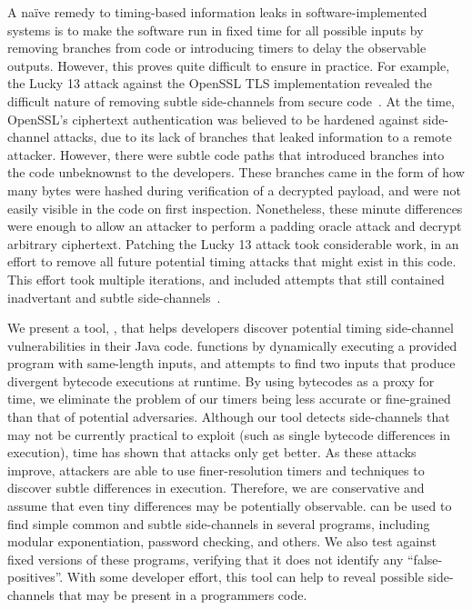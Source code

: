 A na\"ive remedy to timing-based information leaks in software-implemented
systems is to make the software run in fixed time for all possible inputs by
removing branches from code or
introducing timers to delay the observable outputs. 
However, this proves quite difficult to ensure in practice. For example, the Lucky 13
attack against the OpenSSL TLS implementation revealed the difficult nature of
removing subtle side-channels from secure code~\cite{al2013lucky}. At the time, OpenSSL's
ciphertext authentication was believed to be hardened against
side-channel attacks, due to its lack of branches that leaked information to a
remote attacker. However, there were subtle code paths that introduced branches
into the code unbeknownst to the developers. These branches came in the form of
how many bytes were hashed during verification of a decrypted payload, and were not easily
visible in the code on first inspection. Nonetheless, these minute differences
were enough to allow an attacker to perform a padding oracle attack and decrypt
arbitrary ciphertext. Patching the Lucky 13 attack took considerable work, in an
effort to remove all future potential timing attacks that might exist in this
code. This effort took multiple iterations, and included attempts that still
contained inadvertant and subtle side-channels~\cite{agl-lucky13}.

We present a tool, \jcupid, that helps developers discover
potential timing side-channel vulnerabilities in their Java code. \jcupid
functions by dynamically executing a provided program with same-length inputs,
and attempts to find two inputs that produce divergent bytecode executions at
runtime. By using bytecodes as a proxy for time, we eliminate the problem of
our timers being less accurate or fine-grained than that of potential
adversaries. Although our tool detects side-channels that may not be currently
practical to exploit (such as single bytecode differences in execution), time has shown
that attacks only get better. As these attacks improve, attackers are
able to use finer-resolution timers and techniques to discover subtle
differences in execution. Therefore, we are conservative and assume that even
tiny differences may be potentially observable.
\jcupid can be used to find simple common and subtle side-channels in several
programs, including modular exponentiation, password checking, and others. We
also test \jcupid against fixed versions of these programs, verifying that it
does not identify any ``false-positives''. With some developer effort, this tool
can help to reveal possible side-channels that may be present in a programmers
code.

